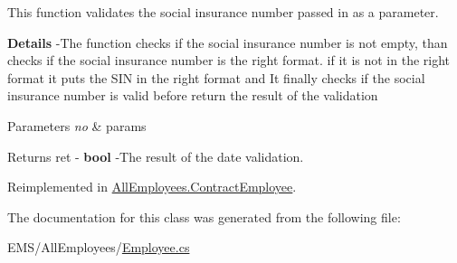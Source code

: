 This function validates the social insurance number passed in as a parameter. 

{\bfseries Details} -\/\-The function checks if the social insurance number is not empty, than checks if the social insurance number is the right format. if it is not in the right format it puts the S\-I\-N in the right format and It finally checks if the social insurance number is valid before return the result of the validation 
\begin{DoxyParams}{Parameters}
{\em no} & params \\
\hline
\end{DoxyParams}
\begin{DoxyReturn}{Returns}
ret -\/ {\bfseries bool} -\/\-The result of the date validation. 
\end{DoxyReturn}


Reimplemented in \hyperlink{class_all_employees_1_1_contract_employee_a1a0b62df589342e937dfb7d3a0b11064}{All\-Employees.\-Contract\-Employee}.



The documentation for this class was generated from the following file\-:\begin{DoxyCompactItemize}
\item 
E\-M\-S/\-All\-Employees/\hyperlink{_employee_8cs}{Employee.\-cs}\end{DoxyCompactItemize}
